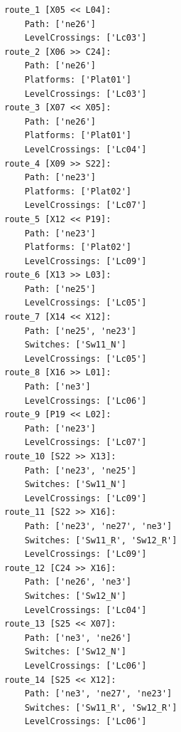 	\begin{lstlisting}[language = {}, caption = Routes.RNA, label = {lst:EJ8_7}]
route_1 [X05 << L04]:
	Path: ['ne26']
	LevelCrossings: ['Lc03']
route_2 [X06 >> C24]:
	Path: ['ne26']
	Platforms: ['Plat01']
	LevelCrossings: ['Lc03']
route_3 [X07 << X05]:
	Path: ['ne26']
	Platforms: ['Plat01']
	LevelCrossings: ['Lc04']
route_4 [X09 >> S22]:
	Path: ['ne23']
	Platforms: ['Plat02']
	LevelCrossings: ['Lc07']
route_5 [X12 << P19]:
	Path: ['ne23']
	Platforms: ['Plat02']
	LevelCrossings: ['Lc09']
route_6 [X13 >> L03]:
	Path: ['ne25']
	LevelCrossings: ['Lc05']
route_7 [X14 << X12]:
	Path: ['ne25', 'ne23']
	Switches: ['Sw11_N']
	LevelCrossings: ['Lc05']
route_8 [X16 >> L01]:
	Path: ['ne3']
	LevelCrossings: ['Lc06']
route_9 [P19 << L02]:
	Path: ['ne23']
	LevelCrossings: ['Lc07']
route_10 [S22 >> X13]:
	Path: ['ne23', 'ne25']
	Switches: ['Sw11_N']
	LevelCrossings: ['Lc09']
route_11 [S22 >> X16]:
	Path: ['ne23', 'ne27', 'ne3']
	Switches: ['Sw11_R', 'Sw12_R']
	LevelCrossings: ['Lc09']
route_12 [C24 >> X16]:
	Path: ['ne26', 'ne3']
	Switches: ['Sw12_N']
	LevelCrossings: ['Lc04']
route_13 [S25 << X07]:
	Path: ['ne3', 'ne26']
	Switches: ['Sw12_N']
	LevelCrossings: ['Lc06']
route_14 [S25 << X12]:
	Path: ['ne3', 'ne27', 'ne23']
	Switches: ['Sw11_R', 'Sw12_R']
	LevelCrossings: ['Lc06']
	\end{lstlisting}	